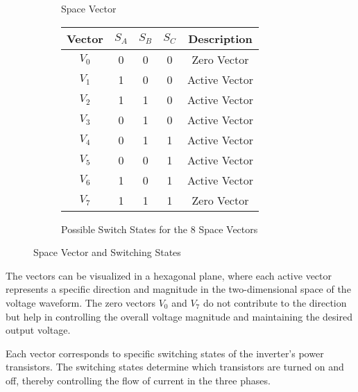 \begin{figure}[ht]
\begin{subfigure}[b]{0.45\textwidth}
{
        }
        \caption{Space Vector}
        \label{fig:SVM}
    \end{subfigure}
    \hfill
    \begin{subfigure}[b]{0.45\textwidth}
        \centering
        \begin{tabular}{|c|c|c|c|c|}
            \hline
            Vector  & \(S_A\) & \(S_B\) & \(S_C\) & Description   \\ \hline
            \(V_0\) & 0       & 0       & 0       & Zero Vector   \\ \hline
            \(V_1\) & 1       & 0       & 0       & Active Vector \\ \hline
            \(V_2\) & 1       & 1       & 0       & Active Vector \\ \hline
            \(V_3\) & 0       & 1       & 0       & Active Vector \\ \hline
            \(V_4\) & 0       & 1       & 1       & Active Vector \\ \hline
            \(V_5\) & 0       & 0       & 1       & Active Vector \\ \hline
            \(V_6\) & 1       & 0       & 1       & Active Vector \\ \hline
            \(V_7\) & 1       & 1       & 1       & Zero Vector   \\ \hline
        \end{tabular}
        \caption{Possible Switch States for the 8 Space Vectors}
        \label{tab:switch_states}
    \end{subfigure}
    \caption{Space Vector and Switching States}
    \label{fig:combined}
\end{figure}

The vectors can be visualized in a hexagonal plane, where each active vector
represents a specific direction and magnitude in the two-dimensional space of
the voltage waveform. The zero vectors $V_0$ and $V_7$ do not contribute to the
direction but help in controlling the overall voltage magnitude and maintaining
the desired output voltage.

Each vector corresponds to specific switching states of the inverter's power
transistors. The switching states determine which transistors are turned on and
off, thereby controlling the flow of current in the three phases.

